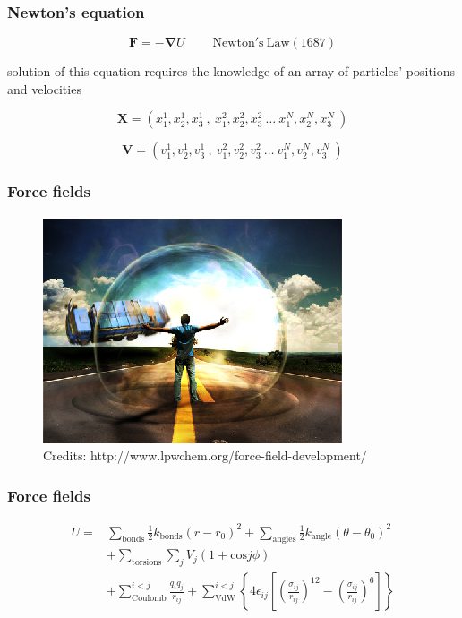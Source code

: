 \documentclass{beamer}
\begin{document}
\begin{frame}
  \frametitle{Newton's equation}
  
  \begin{equation}
	  \mathbf{F}= - \mathbf{\nabla} U      \mathrm{~~~~~~~~~~Newton's~ Law (1687)}
  \end{equation}

  solution of this equation requires the knowledge of an array of
  particles' positions and velocities

  \begin{equation}
          \mathbf{X}= (x^1_1,x^1_2,x^1_3 ~,~ x^2_1,x^2_2,x^2_3 ~\ldots~ x^N_1,x^N_2,x^N_3~)
  \end{equation}


  \begin{equation}
          \mathbf{V}= (v^1_1,v^1_2,v^1_3~,~ v^2_1,v^2_2,v^2_3 ~\ldots~ v^N_1,v^N_2,v^N_3~)
  \end{equation}

\end{frame}


\begin{frame}\frametitle{Force fields}

\begin{figure}
\includegraphics[scale=1.481]{force_field_squarespace.eps}
\caption{{\scriptsize Credits: http://www.lpwchem.org/force-field-development/}}
\end{figure}

\end{frame}

\begin{frame}\frametitle{Force fields}

\begin{equation}
\begin{aligned}
	U  = & \sum_{\textrm{bonds}} \frac{1}{2} k_{\textrm{bonds}} (r-r_0)^2 + \sum_{\textrm{angles}} \frac{1}{2} k_{\textrm{angle}} 
	(\theta-\theta_0)^2 \\
	&+\sum_{\textrm{torsions}} \sum_j V_j(1+\textrm{cos}j\phi)  \\
 &+ \sum_{\textrm{Coulomb}}^{i<j} \frac{q_i q_j}{r_{ij}}  +  \sum_{\textrm{VdW}}^{i<j} 
\left\{ 4\epsilon_{ij} \left[ \left( \frac{\sigma_{ij}}{r_{ij}} \right)^{12}-  \left( \frac{\sigma_{ij}}{r_{ij}} \right)^{6} \right]  \right\}
\end{aligned}
\end{equation}


\end{frame}
\end{document}
